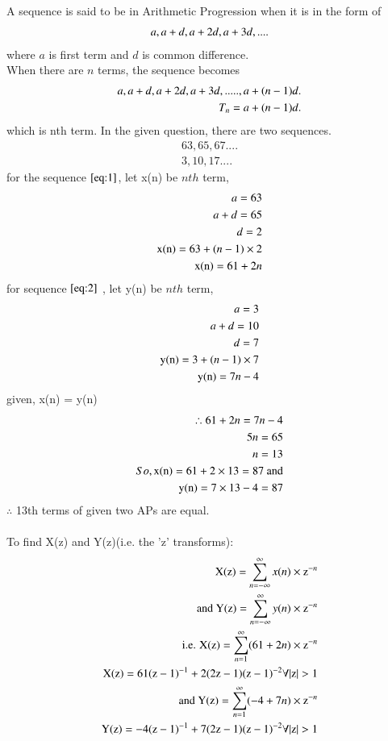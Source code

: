 \documentclass[journal,12pt,twocolumn]{IEEEtran}
\theoremstyle{remark}
\begin{document}
A sequence is said to be in Arithmetic Progression when it is in the form of
\begin{align}
\notag a, a+d, a+2d, a+3d,....
\end{align}
where $a$ is first term and $d$ is common difference.\\
When there are $ n$ terms, the sequence becomes
\begin{align}
\notag a, a+d, a+2d, a+3d,....., a+(n-1)d.\\
\notag T_n = a+(n-1)d.
\end{align}
which is nth term.
In the given question, there are two sequences.
\begin{align}
63, 65, 67....\label{eq:1}\\
3, 10, 17....\label{eq:2}
\end{align}
for the sequence $ \eqref{eq:1}$, let x(n) be $ nth$ term,
\begin{align}
\notag a = 63\\
\notag a+d = 65\\
\notag d = 2\\
\notag \text{x(n)} = 63 + (n-1)\times2\\
\text{x(n)} = 61 + 2n \label{eq:3}
\end{align}
for sequence $ \eqref{eq:2}$ , let y(n) be $ nth$ term,
\begin{align}
\notag a = 3 \\
\notag a+d = 10\\
\notag d = 7\\
\notag \text{y(n)} = 3 + (n-1)\times7\\
\text{y(n)} = 7n - 4 \label{eq:4}
\end{align}
given, x(n) = y(n)\\
\begin{align}
\therefore 61 + 2n = 7n -4\\
\notag 5n = 65\\
n = 13\\
\notag So, \text{x(n)} = 61 + 2\times13 = 87 \text{ and}\\
\notag \text{y(n)} = 7\times13 - 4 = 87
\end{align}
$ \therefore$ 13th terms of given two APs are equal.\\\\
\vspace{0.5cm}
To find X(z) and Y(z)(i.e. the 'z' transforms):\\
\begin{align}
\text{X(z)} = \sum_{n=-\infty}^{\infty} x(n)\times \text{z}^{-n}\\
\text{and Y(z)} = \sum_{n=-\infty}^{\infty} y(n)\times \text{z}^{-n}\\
\notag \text{i.e. X(z)} = \sum_{n=1}^{\infty} (61 + 2n)\times \text{z}^{-n}\\
\text{X(z)} = 61(\text{z}-1)^{-1} + 2(2\text{z}-1)(\text{z}-1)^{-2}  \forall  |\text{z}|>1\\
\notag \text{and Y(z)} = \sum_{n=1}^{\infty} (-4 + 7n)\times \text{z}^{-n}\\
\text{Y(z)} = -4(\text{z}-1)^{-1} + 7(2\text{z}-1)(\text{z}-1)^{-2} \forall  |\text{z}|>1
\end{align}
\end{document}
